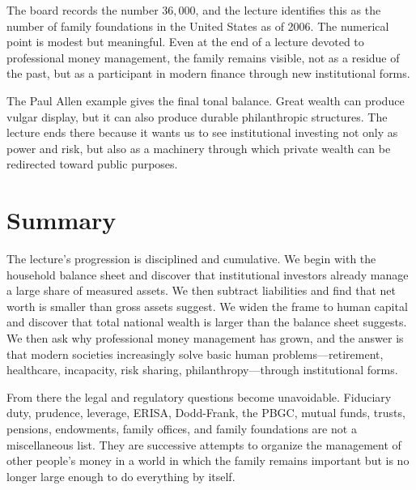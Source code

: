 The board records the number \(36{,}000\), and the lecture identifies this as the number of family foundations in the United States as of 2006. The numerical point is modest but meaningful. Even at the end of a lecture devoted to professional money management, the family remains visible, not as a residue of the past, but as a participant in modern finance through new institutional forms.

The Paul Allen example gives the final tonal balance. Great wealth can produce vulgar display, but it can also produce durable philanthropic structures. The lecture ends there because it wants us to see institutional investing not only as power and risk, but also as a machinery through which private wealth can be redirected toward public purposes.

\section{Summary}

The lecture's progression is disciplined and cumulative. We begin with the household balance sheet and discover that institutional investors already manage a large share of measured assets. We then subtract liabilities and find that net worth is smaller than gross assets suggest. We widen the frame to human capital and discover that total national wealth is larger than the balance sheet suggests. We then ask why professional money management has grown, and the answer is that modern societies increasingly solve basic human problems---retirement, healthcare, incapacity, risk sharing, philanthropy---through institutional forms.

From there the legal and regulatory questions become unavoidable. Fiduciary duty, prudence, leverage, ERISA, Dodd-Frank, the PBGC, mutual funds, trusts, pensions, endowments, family offices, and family foundations are not a miscellaneous list. They are successive attempts to organize the management of other people's money in a world in which the family remains important but is no longer large enough to do everything by itself.